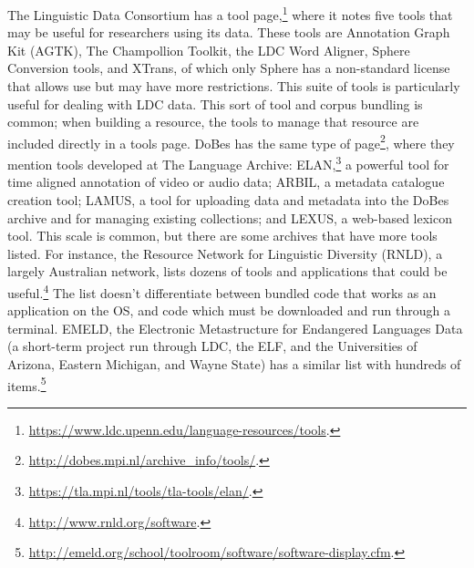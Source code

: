 The Linguistic Data Consortium has a tool page,\footnote{\href{https://www.ldc.upenn.edu/language-resources/tools}{https://www.ldc.upenn.edu/language-resources/tools}. } where it notes five tools that may be useful for researchers using its data. These tools are Annotation Graph Kit (AGTK), The Champollion Toolkit, the LDC Word Aligner, Sphere Conversion tools, and XTrans, of which only Sphere has a non-standard license that allows use but may have more restrictions. This suite of tools is particularly useful for dealing with LDC data. This sort of tool and corpus bundling is common; when building a resource, the tools to manage that resource are included directly in a tools page. DoBes has the same type of page\footnote{\href{http://dobes.mpi.nl/archive_info/tools/}{http://dobes.mpi.nl/archive\_info/tools/}. }, where they mention tools developed at The Language Archive: ELAN,\footnote{\href{https://tla.mpi.nl/tools/tla-tools/elan/}{https://tla.mpi.nl/tools/tla-tools/elan/}. } a powerful tool for time aligned annotation of video or audio data; ARBIL, a metadata catalogue creation tool; LAMUS, a tool for uploading data and metadata into the DoBes archive and for managing existing collections; and LEXUS, a web-based lexicon tool. This scale is common, but there are some archives that have more tools listed. For instance, the Resource Network for Linguistic Diversity (RNLD), a largely Australian network, lists dozens of tools and applications that could be useful.\footnote{\href{http://www.rnld.org/software}{http://www.rnld.org/software}. } The list doesn't differentiate between bundled code that works as an application on the OS, and code which must be downloaded and run through a terminal. EMELD, the Electronic Metastructure for Endangered Languages Data (a short-term project run through LDC, the ELF, and the Universities of Arizona, Eastern Michigan, and Wayne State) has a similar list with hundreds of items.\footnote{\href{http://emeld.org/school/toolroom/software/software-display.cfm}{http://emeld.org/school/toolroom/software/software-display.cfm}. }

